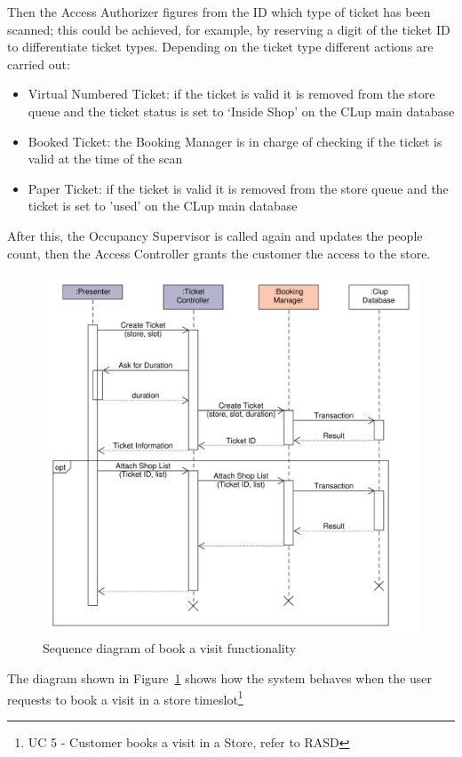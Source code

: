 Then the Access Authorizer figures from the ID which type of ticket has been scanned; this could be achieved, for example, by reserving a digit of the ticket ID to differentiate ticket types.
Depending on the ticket type different actions are carried out:
\begin{itemize}
    \item Virtual Numbered Ticket: if the ticket is valid it is removed from the store queue and the ticket status is set to `Inside Shop' on the CLup main database
    \item Booked Ticket: the Booking Manager is in charge of checking if the ticket is valid at the time of the scan
    \item Paper Ticket: if the ticket is valid it is removed from the store queue and the ticket is set to 'used' on the CLup main database
\end{itemize}

After this, the Occupancy Supervisor is called again and updates the people count, then the Access Controller grants the customer the access to the store.
\begin{figure}[H]
    \includegraphics[width=\textwidth]{Images/UML_user_book_visit.pdf}
    \caption{\label{fig:UML_user_book_visit}Sequence diagram of book a visit functionality}
\end{figure}
The diagram shown in Figure~\ref{fig:UML_user_book_visit} shows how the system behaves when the user requests to book a visit in a store timeslot\footnote{UC 5 - Customer books a visit in a Store, refer to RASD}

